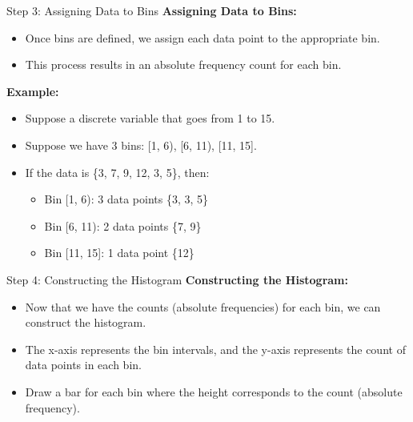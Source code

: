\documentclass[handout]{beamer} %
\begin{document}
\begin{frame}{Step 3: Assigning Data to Bins}
    \textbf{Assigning Data to Bins:}
    \begin{itemize}
        \item Once bins are defined, we assign each data point to the appropriate bin.
        \item This process results in an absolute frequency count for each bin.
    \end{itemize}
    
    \vspace{0.5cm}
    \textbf{Example:}
    \begin{itemize}
        \item Suppose a discrete variable that goes from 1 to 15.
        \item Suppose we have 3 bins: [1, 6), [6, 11), [11, 15].
        \item If the data is \{3, 7, 9, 12, 3, 5\}, then:
        \begin{itemize}
            \item Bin [1, 6): 3 data points \{3, 3, 5\}
            \item Bin [6, 11): 2 data points \{7, 9\}
            \item Bin [11, 15]: 1 data point \{12\}
        \end{itemize}
    \end{itemize}
\end{frame}

\begin{frame}{Step 4: Constructing the Histogram}
    \textbf{Constructing the Histogram:}
    \begin{itemize}
        \item Now that we have the counts (absolute frequencies) for each bin, we can construct the histogram.
        \item The x-axis represents the bin intervals, and the y-axis represents the count of data points in each bin.
        \item Draw a bar for each bin where the height corresponds to the count (absolute frequency).
    \end{itemize}
\end{frame}
\end{document}
